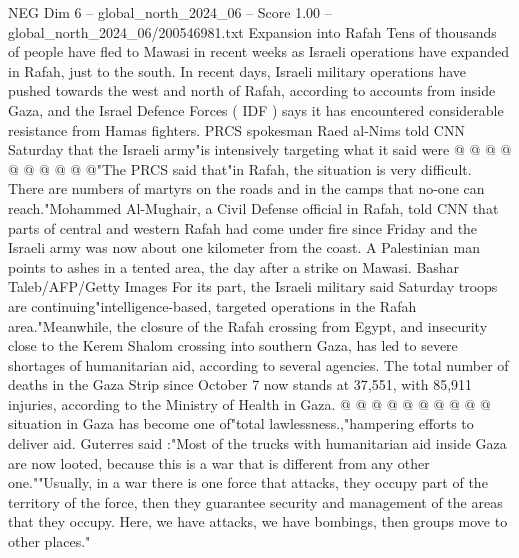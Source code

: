 \begin{textsample}{NEG Dim 6 – global\_north\_2024\_06 – Score 1.00 – global\_north\_2024\_06/200546981.txt}
Expansion into Rafah Tens of thousands of people have fled to Mawasi in recent weeks as Israeli operations have expanded in Rafah, just to the south.
In recent days, Israeli military operations have pushed towards the west and north of Rafah, according to accounts from inside Gaza, and the Israel Defence Forces ( IDF ) says it has encountered considerable resistance from Hamas fighters.
PRCS spokesman Raed al-Nims told CNN Saturday that the Israeli army"is intensively targeting what it said were @ @ @ @ @ @ @ @ @ @"The PRCS said that"in Rafah, the situation is very difficult.
There are numbers of martyrs on the roads and in the camps that no-one can reach."Mohammed Al-Mughair, a Civil Defense official in Rafah, told CNN that parts of central and western Rafah had come under fire since Friday and the Israeli army was now about one kilometer from the coast.
A Palestinian man points to ashes in a tented area, the day after a strike on Mawasi.
Bashar Taleb/AFP/Getty Images For its part, the Israeli military said Saturday troops are continuing"intelligence-based, targeted operations in the Rafah area."Meanwhile, the closure of the Rafah crossing from Egypt, and insecurity close to the Kerem Shalom crossing into southern Gaza, has led to severe shortages of humanitarian aid, according to several agencies.
The total number of deaths in the Gaza Strip since October 7 now stands at 37,551, with 85,911 injuries, according to the Ministry of Health in Gaza. @ @ @ @ @ @ @ @ @ @ situation in Gaza has become one of"total lawlessness.,"hampering efforts to deliver aid.
Guterres said :"Most of the trucks with humanitarian aid inside Gaza are now looted, because this is a war that is different from any other one.""Usually, in a war there is one force that attacks, they occupy part of the territory of the force, then they guarantee security and management of the areas that they occupy.
Here, we have attacks, we have bombings, then groups move to other places."

\end{textsample}
